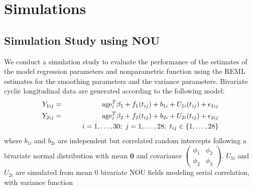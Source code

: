 \documentclass[article,lineno]{biometrika}
\begin{document}
%
%
%

\section{Simulations} \label{simulation}
\subsection{Simulation Study using NOU}
We conduct a  simulation study to evaluate the performance of the estimates of the model regression parameters and nonparametric function using the REML estimates for the smoothing parameters and the variance parameters. Bivariate cyclic longitudinal data are generated according to the following model:
\begin{eqnarray*}
Y_{1ij} &=& {\rm age}_i^T  \beta_1 + f_1(t_{ij}) + b_{1i} + U_{1i}(t_{ij}) + \epsilon_{1ij}  \\
Y_{2ij} &=& {\rm age}_i^T  \beta_2 + f_2(t_{ij}) + b_{2i} + U_{2i}(t_{ij}) + \epsilon_{2ij} \\
&& \quad\quad i = 1, \dots, 30; \ j = 1, \dots, 28; \ t_{ij} \in \{1, \dots, 28\}
\end{eqnarray*}
where $ b_{1i}$ and $ b_{2i}$ are independent but correlated random intercepts following a bivariate normal distribution with mean $\bm 0$ and covariance 
$
\begin{pmatrix}
\phi_{1} &   \phi_{2}  \\
\phi_{2} &   \phi_{3} 
\end{pmatrix}.
$
$U_{1i}$ and $U_{2i}$ are simulated from mean $0$ bivariate NOU fields modeling serial correlation, with variance function 
\end{document}
